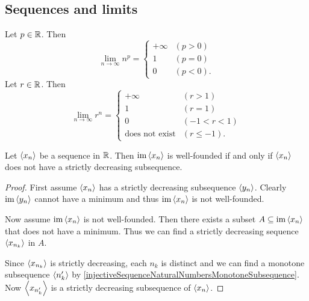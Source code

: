 \subsection{Sequences and limits}
\begin{example}
Let $p\in\mathbb{R}$. Then
\[ \lim_{n\to\infty} n^p = \begin{cases}
+\infty & (p>0) \\
1 & (p=0) \\
0 & (p<0).
\end{cases} \]
Let $r\in\mathbb{R}$. Then
\[ \lim_{n\to\infty} r^n = \begin{cases}
+\infty & (r>1) \\
1 & (r=1) \\
0 & (-1<r<1) \\
\text{does not exist} & (r\leq -1).
\end{cases} \]
\end{example}

\begin{lemma} \label{sequenceWellFoundedIffNoDecreasingSubsequence}
Let $\left\langle x_n \right\rangle$ be a sequence in $\mathbb{R}$. Then $\operatorname{im}\left\langle x_n \right\rangle$ is well-founded \textup{if and only if} $\left\langle x_n \right\rangle$ does not have a strictly decreasing subsequence.
\end{lemma}
\begin{proof}
First assume $\left\langle x_n \right\rangle$ has a strictly decreasing subsequence $\left\langle y_n \right\rangle$. Clearly $\operatorname{im}\left\langle y_n \right\rangle$ cannot have a minimum and thus $\operatorname{im}\left\langle x_n \right\rangle$ is not well-founded.

Now assume $\operatorname{im}\left\langle x_n \right\rangle$ is not well-founded. Then there exists a subset $A\subseteq \operatorname{im}\left\langle x_n \right\rangle$ that does not have a minimum. Thus we can find a strictly decreasing sequence $\left\langle x_{n_k} \right\rangle$ in $A$.

Since $\left\langle x_{n_k} \right\rangle$ is strictly decreasing, each $n_k$ is distinct and we can find a monotone subsequence $\left\langle n'_k \right\rangle$ by \ref{injectiveSequenceNaturalNumbersMonotoneSubsequence}. Now $\left\langle x_{n'_k} \right\rangle$ is a strictly decreasing subsequence of $\left\langle x_n \right\rangle$.
\end{proof}

